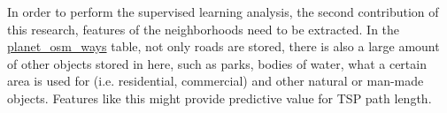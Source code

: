 In order to perform the supervised learning analysis, the second contribution of this research,
features of the neighborhoods need to be extracted. In the \url{planet_osm_ways} table, not only roads are stored,
there is also a large amount of other objects stored in here, such as parks, bodies of water, what a certain area is used for
(i.e. residential, commercial) and other natural or man-made
objects. Features like this might provide predictive value for TSP path length.
